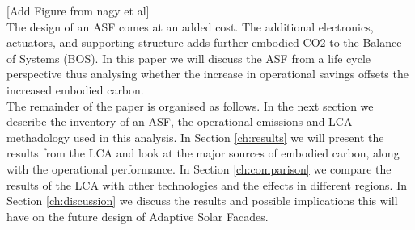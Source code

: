 [Add Figure from nagy et al]\\

The design of an ASF comes at an added cost. The additional electronics, actuators, and supporting structure adds further embodied CO2 to the Balance of Systems (BOS). In this paper we will discuss the ASF from a life cycle perspective thus analysing whether the increase in operational savings offsets the increased embodied carbon. \\
The remainder of the paper is organised as follows. In the next section we describe the inventory of an ASF, the operational emissions and LCA methadology used in this analysis. In Section \ref{ch:results} we will present the results from the LCA and look at the major sources of embodied carbon, along with the operational performance. In Section \ref{ch:comparison} we compare the results of the LCA with other technologies and the effects in different regions. In Section \ref{ch:discussion} we discuss the results and possible implications this will have on the future design of Adaptive Solar Facades. 















